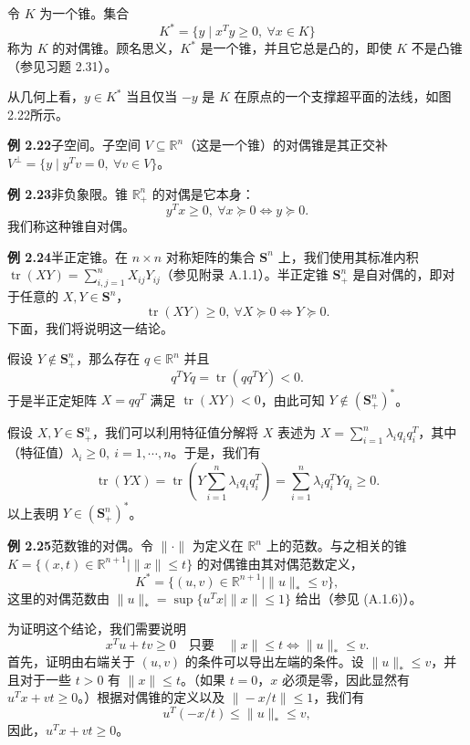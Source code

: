 \documentclass[UTF8,12pt,a4paper,fontset=fandol]{ctexart}
\begin{document}
令 $K$ 为一个锥。集合
\begin{equation}
  K^*=\{y\mid x^Ty\ge0,\ \forall x\in K\}
  \tag{2.19}
\end{equation}
称为 $K$ 的对偶锥。顾名思义，$K^*$ 是一个锥，并且它总是凸的，即使 $K$ 不是凸锥（参见习题 2.31）。

从几何上看，$y\in K^*$ 当且仅当 $-y$ 是 $K$ 在原点的一个支撑超平面的法线，如图2.22所示。

\noindent\textbf{例 2.22}\quad 子空间。子空间 $V\subseteq\mathbb{R}^n$（这是一个锥）的对偶锥是其正交补 $V^\perp=\{y\mid y^Tv=0,\ \forall v\in V\}$。

\noindent\textbf{例 2.23}\quad 非负象限。锥 $\mathbb{R}_+^n$ 的对偶是它本身：
\[
  y^Tx\ge0,\ \forall x\succeq0\Longleftrightarrow y\succeq0.
\]
我们称这种锥自对偶。

\noindent\textbf{例 2.24}\quad 半正定锥。在 $n\times n$ 对称矩阵的集合 $\mathbf{S}^n$ 上，我们使用其标准内积 $\operatorname{tr}(XY)=\sum_{i,j=1}^n X_{ij}Y_{ij}$（参见附录 A.1.1）。半正定锥 $\mathbf{S}_+^n$ 是自对偶的，即对于任意的 $X,Y\in\mathbf{S}^n$，
\[
  \operatorname{tr}(XY)\ge0,\ \forall X\succeq0 \Longleftrightarrow Y\succeq0.
\]
下面，我们将说明这一结论。

假设 $Y\notin\mathbf{S}_+^n$，那么存在 $q\in\mathbb{R}^n$ 并且
\[
  q^TYq=\operatorname{tr}(qq^TY)<0.
\]
于是半正定矩阵 $X=qq^T$ 满足 $\operatorname{tr}(XY)<0$，由此可知 $Y\notin(\mathbf{S}_+^n)^*$。

假设 $X,Y\in\mathbf{S}_+^n$，我们可以利用特征值分解将 $X$ 表述为 $X=\sum_{i=1}^n\lambda_iq_iq_i^T$，其中（特征值）$\lambda_i\ge0,\ i=1,\cdots,n$。于是，我们有
\[
  \operatorname{tr}(YX)=\operatorname{tr}\left(Y\sum_{i=1}^n\lambda_iq_iq_i^T\right)
  =\sum_{i=1}^n\lambda_iq_i^TYq_i\ge0.
\]
以上表明 $Y\in(\mathbf{S}_+^n)^*$。

\noindent\textbf{例 2.25}\quad 范数锥的对偶。令 $\|\cdot\|$ 为定义在 $\mathbb{R}^n$ 上的范数。与之相关的锥 $K=\{(x,t)\in\mathbb{R}^{n+1}\mid\|x\|\le t\}$ 的对偶锥由其对偶范数定义，
\[
  K^*=\{(u,v)\in\mathbb{R}^{n+1}\mid \|u\|_*\le v\},
\]
这里的对偶范数由 $\|u\|_*=\sup\{u^Tx\mid\|x\|\le1\}$ 给出（参见 (A.1.6)）。

为证明这个结论，我们需要说明
\begin{equation}
  x^Tu+tv\ge0\quad \text{只要}\quad \|x\|\le t
  \Longleftrightarrow \|u\|_*\le v.
  \tag{2.20}
\end{equation}
首先，证明由右端关于 $(u,v)$ 的条件可以导出左端的条件。设 $\|u\|_*\le v$，并且对于一些 $t>0$ 有 $\|x\|\le t$。（如果 $t=0$，$x$ 必须是零，因此显然有 $u^Tx+vt\ge0$。）根据对偶锥的定义以及 $\|-x/t\|\le1$，我们有
\[
  u^T(-x/t)\le\|u\|_*\le v,
\]
因此，$u^Tx+vt\ge0$。
\end{document}
